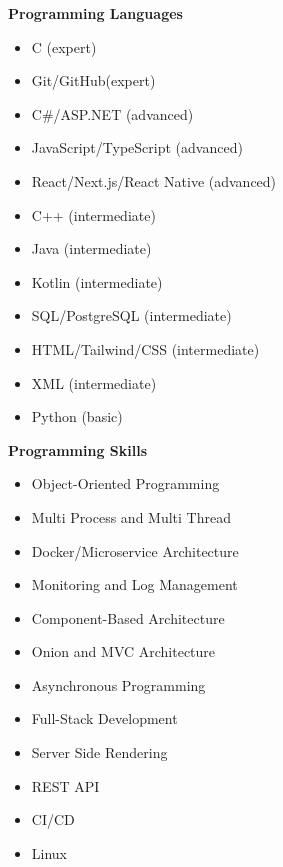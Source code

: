 \documentclass[a4paper,11pt]{article}
\begin{document}
\vspace{-0.5em}

\noindent
\begin{minipage}[t]{0.48\textwidth}
    \textbf{Programming Languages}
    \vspace{0em}
    \begin{itemize}
        \item C (expert)
        \item Git/GitHub(expert)
        \item C\#/ASP.NET (advanced)
        \item JavaScript/TypeScript (advanced)
        \item React/Next.js/React Native (advanced)
        \item C++ (intermediate)
        \item Java (intermediate)
        \item Kotlin (intermediate)
        \item SQL/PostgreSQL (intermediate)
        \item HTML/Tailwind/CSS (intermediate)
        \item XML (intermediate)
        \item Python (basic)
    \end{itemize}
\end{minipage}%
\hfill
\begin{minipage}[t]{0.48\textwidth}
    \textbf{Programming Skills}
    \vspace{0em}
\begin{itemize}
\item Object-Oriented Programming
        \item Multi Process and Multi Thread
        \item Docker/Microservice Architecture
        \item Monitoring and Log Management
        \item Component-Based Architecture
        \item Onion and MVC Architecture 
        \item Asynchronous Programming 
        \item Full-Stack Development
        \item Server Side Rendering
        \item REST API
        \item CI/CD
        \item Linux
\end{itemize}
\end{minipage}
\end{document}
